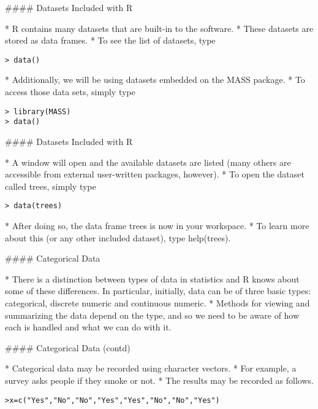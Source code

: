 
#### {Datasets Included with R}
\begin{itemize}
* R contains many datasets that are built-in to the software. * These datasets are stored as data
frames. * To see the list of datasets, type
\begin{verbatim}
> data()
\end{verbatim}
* Additionally, we will be using datasets embedded on the MASS package.
* To access those data sets, simply type
\begin{verbatim}
> library(MASS)
> data()
\end{verbatim}
\end{itemize}



#### {Datasets Included with R}
\begin{itemize}
* A window will open and the available datasets are listed (many others are accessible from
external user-written packages, however). * To open the dataset called trees, simply type

\begin{verbatim}
> data(trees)
\end{verbatim}

* After doing so, the data frame trees is now in your workspace. *  To learn more about this (or
any other included dataset), type help(trees).
\end{itemize}



#### {Categorical Data}
\begin{itemize}
* 
There is a distinction between types of data in statistics and R knows about some of these differences. In particular,
initially, data can be of three basic types: categorical, discrete numeric and continuous numeric. * Methods for viewing
and summarizing the data depend on the type, and so we need to be aware of how each is handled and what we can
do with it.
\end{itemize}



#### {Categorical Data (contd)}
\begin{itemize}
* Categorical data may be recorded using character vectors.
* For example, a survey asks people if they smoke or not. * The results may be recorded as follows.

\begin{verbatim}
>x=c("Yes","No","No","Yes","Yes","No","No","Yes")
\end{verbatim}
\end{itemize}




